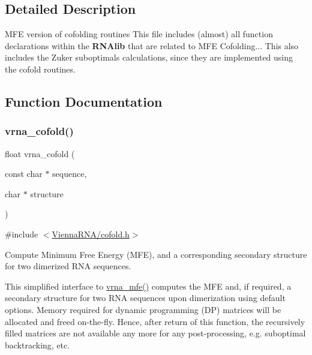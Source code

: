 \subsection{Detailed Description}
M\+FE version of cofolding routines This file includes (almost) all function declarations within the {\bfseries R\+N\+Alib} that are related to M\+FE Cofolding... This also includes the Zuker suboptimals calculations, since they are implemented using the cofold routines. 



\subsection{Function Documentation}
\mbox{\label{group__mfe__cofold_ga9ef3a297201dbf838a8daff2b45c0c82}} 
\subsubsection{\texorpdfstring{vrna\+\_\+cofold()}{vrna\_cofold()}}
{\footnotesize\ttfamily float vrna\+\_\+cofold (\begin{DoxyParamCaption}\item[{const char $\ast$}]{sequence,  }\item[{char $\ast$}]{structure }\end{DoxyParamCaption})}



{\ttfamily \#include $<$\hyperlink{cofold_8h}{Vienna\+R\+N\+A/cofold.\+h}$>$}



Compute Minimum Free Energy (M\+FE), and a corresponding secondary structure for two dimerized R\+NA sequences. 

This simplified interface to \hyperlink{group__mfe__fold_gabd3b147371ccf25c577f88bbbaf159fd}{vrna\+\_\+mfe()} computes the M\+FE and, if required, a secondary structure for two R\+NA sequences upon dimerization using default options. Memory required for dynamic programming (DP) matrices will be allocated and free\textquotesingle{}d on-\/the-\/fly. Hence, after return of this function, the recursively filled matrices are not available any more for any post-\/processing, e.\+g. suboptimal backtracking, etc.

